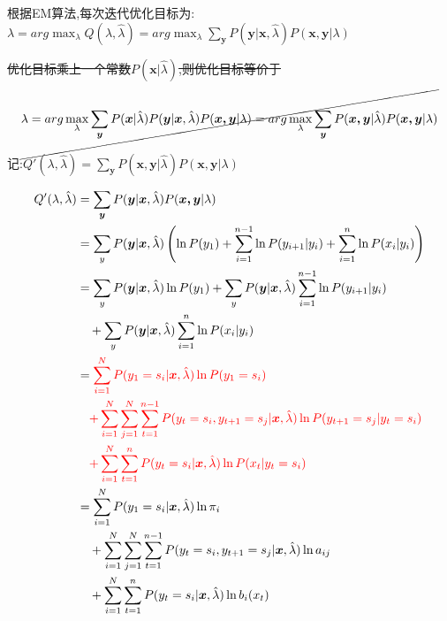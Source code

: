 \documentclass[UTF8,a4paper]{ctexart}%
\begin{document}
            根据EM算法,每次迭代优化目标为:
            $\lambda = arg \max_{\lambda} Q(\lambda , \hat{\lambda}) = arg \max_{\lambda} \sum_{\bm{y}} P(\bm{y}|\bm{x},\hat{\lambda})P(\bm{x,y}|\lambda)$

            \sout{优化目标乘上一个常数$P(\bm{x}|\hat{\lambda})$,则优化目标等价于}
              \[ \cancel{\lambda = arg \max_{\lambda} \sum_{\bm{y}} P(\bm{x}|\hat{\lambda})P(\bm{y}|\bm{x},\hat{\lambda})P(\bm{x,y}|\lambda) = arg \max_{\lambda} \sum_{\bm{y}} P(\bm{x,y}|\hat{\lambda})P(\bm{x,y}|\lambda)} \]

            记:$Q'(\lambda,\hat{\lambda}) = \sum_{\bm{y}} P(\bm{x,y}|\hat{\lambda})P(\bm{x,y}|\lambda)$

            \begin{align}
              Q'(\lambda,\hat{\lambda}) &= \sum_{\bm{y}} P(\bm{y}|\bm{x},\hat{\lambda})P(\bm{x,y}|\lambda)\\
                &= \sum_{y} P(\bm{y}|\bm{x},\hat{\lambda}) \left( \ln P(y_1) + \sum_{i = 1}^{n-1} \ln P(y_{i+1}|y_{i}) + \sum_{i = 1}^n \ln P(x_i|y_i) \right )\\
                &= \sum_{y} P(\bm{y}|\bm{x},\hat{\lambda}) \ln P(y_1)
                  + \sum_{y} P(\bm{y}|\bm{x},\hat{\lambda})  \sum_{i = 1}^{n-1} \ln P(y_{i+1}|y_{i})\\
                  &\quad + \sum_{y} P(\bm{y}|\bm{x},\hat{\lambda}) \sum_{i = 1}^n \ln P(x_i|y_i) \notag \\
                &= {\color{red}
                \sum_{i = 1}^N  P(y_1 = s_i|\bm{x},\hat{\lambda}) \ln P(y_1 = s_i)}\\
                  &\quad{\color{red}
                  + \sum_{i = 1}^N \sum_{j = 1}^N \sum_{t = 1}^{n-1}
                       P(y_t = s_i , y_{t+1} = s_j|\bm{x},\hat{\lambda}) \ln P(y_{t+1} = s_j|y_{t} = s_i)} \notag \\
                  &\quad{\color{red}
                   + \sum_{i = 1}^N \sum_{t = 1}^n P(y_t = s_i|\bm{x},\hat{\lambda}) \ln P(x_t|y_t = s_i)} \notag \\
                &= \sum_{i = 1}^N  P(y_1 = s_i|\bm{x},\hat{\lambda}) \ln \pi_i\\
                  &\quad+ \sum_{i = 1}^N \sum_{j = 1}^N \sum_{t = 1}^{n-1}
                      P(y_t = s_i , y_{t+1} = s_j|\bm{x},\hat{\lambda}) \ln a_{ij} \notag\\
                  &\quad + \sum_{i = 1}^N \sum_{t = 1}^n P(y_t = s_i|\bm{x},\hat{\lambda}) \ln b_i(x_t) \notag
            \end{align}
\end{document}
